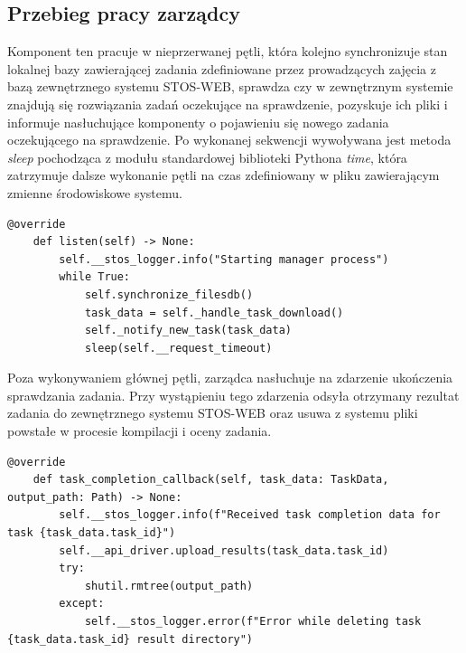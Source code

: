 \subsection{Przebieg pracy zarządcy}
Komponent ten pracuje w nieprzerwanej pętli, która kolejno synchronizuje stan lokalnej bazy zawierającej zadania zdefiniowane przez prowadzących zajęcia z bazą zewnętrznego systemu STOS-WEB, sprawdza czy w zewnętrznym systemie znajdują się rozwiązania zadań oczekujące na sprawdzenie, pozyskuje ich pliki i informuje nasłuchujące komponenty o pojawieniu się nowego zadania oczekującego na sprawdzenie. Po wykonanej sekwencji wywoływana jest metoda \textit{sleep} pochodząca z modułu standardowej biblioteki Pythona \textit{time}\cite{pythonTime}, która zatrzymuje dalsze wykonanie pętli na czas zdefiniowany w pliku zawierającym zmienne środowiskowe systemu.
\lstset{style=python}
\begin{lstlisting}[caption = {Implementacja metody listen.}]
    @override
    def listen(self) -> None:
        self.__stos_logger.info("Starting manager process")
        while True:
            self.synchronize_filesdb()
            task_data = self._handle_task_download()
            self._notify_new_task(task_data)
            sleep(self.__request_timeout)
\end{lstlisting}
Poza wykonywaniem głównej pętli, zarządca nasłuchuje na zdarzenie ukończenia sprawdzania zadania. Przy wystąpieniu tego zdarzenia odsyła otrzymany rezultat zadania do zewnętrznego systemu STOS-WEB oraz usuwa z systemu pliki powstałe w procesie kompilacji i oceny zadania.
\lstset{style=python}
\begin{lstlisting}[caption = {Implementacja metody wywoływanej przy zdarzeniu ukończenia sprawdzania zadania.}]
    @override
    def task_completion_callback(self, task_data: TaskData, output_path: Path) -> None:
        self.__stos_logger.info(f"Received task completion data for task {task_data.task_id}")
        self.__api_driver.upload_results(task_data.task_id)
        try:
            shutil.rmtree(output_path)
        except:
            self.__stos_logger.error(f"Error while deleting task {task_data.task_id} result directory")
\end{lstlisting}
